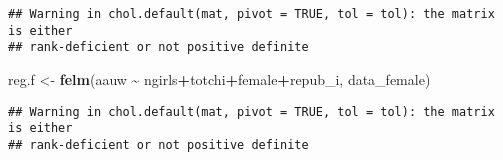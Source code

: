 \documentclass[
]{article}
\newenvironment{Shaded}{\begin{snugshade}}{\end{snugshade}}
\newcommand{\AttributeTok}[1]{\textcolor[rgb]{0.13,0.29,0.53}{#1}}
\newcommand{\ConstantTok}[1]{\textcolor[rgb]{0.56,0.35,0.01}{#1}}
\newcommand{\FloatTok}[1]{\textcolor[rgb]{0.00,0.00,0.81}{#1}}
\newcommand{\FunctionTok}[1]{\textcolor[rgb]{0.13,0.29,0.53}{\textbf{#1}}}
\newcommand{\NormalTok}[1]{#1}
\newcommand{\OtherTok}[1]{\textcolor[rgb]{0.56,0.35,0.01}{#1}}
\newcommand{\SpecialCharTok}[1]{\textcolor[rgb]{0.81,0.36,0.00}{\textbf{#1}}}
\newcommand{\StringTok}[1]{\textcolor[rgb]{0.31,0.60,0.02}{#1}}
\begin{document}
\begin{verbatim}
## Warning in chol.default(mat, pivot = TRUE, tol = tol): the matrix is either
## rank-deficient or not positive definite
\end{verbatim}

\begin{Shaded}
\begin{Highlighting}[]
\NormalTok{reg.f }\OtherTok{\textless{}{-}} \FunctionTok{felm}\NormalTok{(aauw }\SpecialCharTok{\textasciitilde{}}\NormalTok{ ngirls}\SpecialCharTok{+}\NormalTok{totchi}\SpecialCharTok{+}\NormalTok{female}\SpecialCharTok{+}\NormalTok{repub\_i, data\_female)}
\end{Highlighting}
\end{Shaded}

\begin{verbatim}
## Warning in chol.default(mat, pivot = TRUE, tol = tol): the matrix is either
## rank-deficient or not positive definite
\end{verbatim}

\begin{Shaded}
\end{Shaded}
\end{document}
